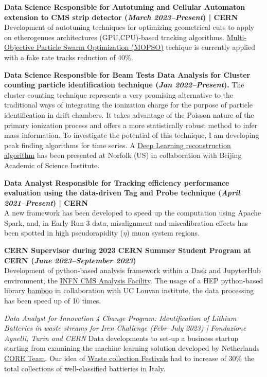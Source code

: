 \documentclass[11pt]{res}
\begin{document}
\begin{resume}
\textbf{Data Science Responsible for Autotuning and Cellular Automaton extension to CMS strip detector (\textit{March 2023--Present}) | CERN}\\
Development of autotuning techniques for optimizing geometrical cuts to apply on etherogenues architectures (GPU,CPU)-based tracking algorithms. \href{https://github.com/bdanzi/CA-parameter-tuning}{Multi-Objective Particle Swarm Optimization (MOPSO)} techique is currently applied with a fake rate tracks reduction of 40\%.

\textbf{Data Science Responsible for Beam Tests Data Analysis for Cluster counting particle identification technique \textbf{(\textit{Jan 2022--Present})}.} 
The cluster counting technique represents a very promising alternative to the traditional ways of integrating the ionization charge for the purpose of particle identification in drift chambers. It takes advantage of the Poisson nature of the primary ionization process and offers a more statistically robust method to infer mass information. To investigate the potential of this technique, I am developing peak finding algorithms for time series. A \href{https://indico.jlab.org/event/459/contributions/11749/}{Deep Learning reconstruction algorithm} has been presented at Norfolk (US) in collaboration with Beijing Academic of Science Institute.

\textbf{Data Analyst Responsible for Tracking efficiency performance evaluation using the data-driven Tag and Probe technique (\textit{April 2021--Present}) | CERN}\\
A new framework has been developed to speed up the computation using Apache Spark, and, in Early Run 3 data, misalignment and miscalibration effects has been spotted in high pseudorapidity ($\eta$) muon system regions.

\textbf{CERN Supervisor during 2023 CERN Summer Student Program at CERN (\textit{June 2023--September 2023})} \\
Development of python-based analysis framework within a Dask and JupyterHub environment, the \href{https://infn-cms-analysisfacility.readthedocs.io/en/latest/}{INFN CMS Analysis Facility}. The usage of a HEP python-based library \href{https://bamboo-hep.readthedocs.io/en/latest/index.html}{bamboo} in collaboration with UC Louvan institute, the data processing has been speed up of 10 times.

\textit{Data Analyst for Innovation 4 Change Program: Identification of Lithium Batteries in waste streams for Iren Challenge (\textit{Febr--July 2023}) | Fondazione Agnelli, Turin and CERN}
Data developments to set-up a business startup starting from examining the machine learning solution developed by Netherlands \href{https://www.core-changemakers.com}{CORE Team}. Our idea of \href{https://weeefestival.mystrikingly.com}{Waste collection Festivals} had to increase of 30\% the total collections of well-classified battieries in Italy.


\end{resume}
\end{document}
